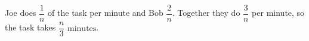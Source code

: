 Joe does $\dfrac1n$ of the task per minute and Bob $\dfrac2n$. Together they do $\dfrac3n$ per minute, so the task takes $\boxed{\dfrac n3\text{ minutes}}$.
